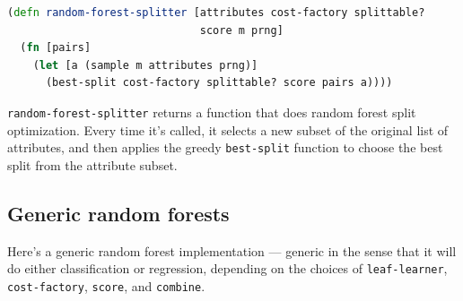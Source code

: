 \documentclass[11pt,openany,american,usenames,dvipsnames,svgnames,x11names,table,isodate]{article}
\numberwithin{equation}{section}
\numberwithin{figure}{section}
\begin{document}
\begin{minipage}[t]{1\columnwidth}%
\begin{lstlisting}[caption={Random forest split optimizer},label={lis:random-forest-splits},language=clojure,tabsize=2]
(defn random-forest-splitter [attributes cost-factory splittable? 
                              score m prng]
  (fn [pairs]
    (let [a (sample m attributes prng)]
      (best-split cost-factory splittable? score pairs a)))) 
\end{lstlisting}
%
\end{minipage}

\texttt{random-forest-splitter} returns a function that does random
forest split optimization. Every time it's called, it selects a new
subset of the original list of attributes, and then applies the greedy
\texttt{best-split} function to choose the best split from the attribute
subset.


\subsection{Generic random forests}

Here's a generic random forest implementation --- generic in the sense
that it will do either classification or regression, depending on
the choices of \texttt{leaf-learner}, \texttt{cost-factory}, \texttt{score},
and \texttt{combine}.
\end{document}
